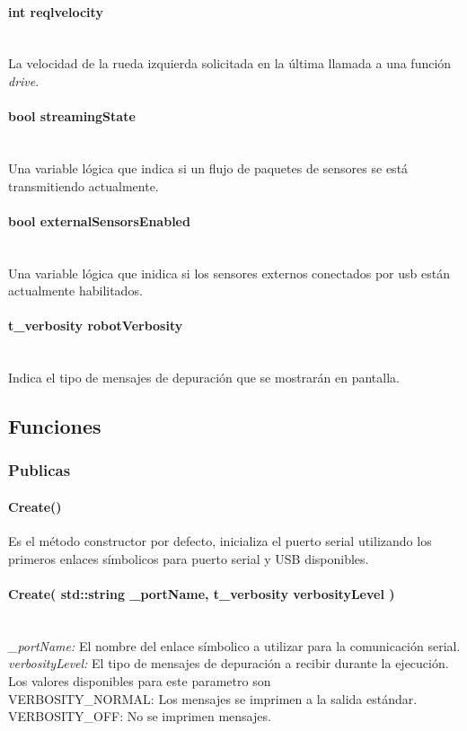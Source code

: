 \documentclass[letterpaper,openright,12pt]{book}
\begin{document}
\paragraph{int reqlvelocity}\mbox{}\\
La velocidad de la rueda izquierda solicitada en la última llamada a una función \emph{drive}.
\paragraph{bool streamingState}\mbox{}\\
Una variable lógica que indica si un flujo de paquetes de sensores se está transmitiendo actualmente.
\paragraph{bool externalSensorsEnabled}\mbox{}\\
Una variable lógica que inidica si los sensores externos conectados por usb están actualmente habilitados.
\paragraph{t\_verbosity robotVerbosity}\mbox{}\\
Indica el tipo de mensajes de depuración que se mostrarán en pantalla.


\subsection{Funciones}
\subsubsection{Publicas}
\paragraph{Create()}
Es el método constructor por defecto, inicializa el puerto serial utilizando los primeros enlaces símbolicos para puerto serial y USB disponibles.

\paragraph{Create( std::string \_portName, t\_verbosity verbosityLevel )}\mbox{}\\
\emph{\_portName: }El nombre del enlace símbolico a utilizar para la comunicación serial.\\
\emph{verbosityLevel: } El tipo de mensajes de depuración a recibir durante la ejecución. Los valores disponibles para este parametro son\\
VERBOSITY\_NORMAL: Los mensajes se imprimen a la salida estándar.\\
VERBOSITY\_OFF: No se imprimen mensajes.\\
\end{document}
